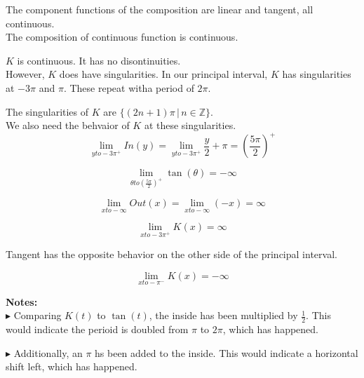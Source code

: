 \documentclass{ximera}
\begin{document}
The component functions of the composition are linear and tangent, all continuous. \\

The composition of continuous function is continuous.

$K$ is continuous. It has no disontinuities. \\


However, $K$ does have singularities. In our principal interval, $K$ has singularities at $-3\pi$ and $\pi$.  These repeat witha period of $2\pi$.


The singularities of $K$ are $\{ (2n+1)\pi  \, | \, n \in \mathbb{Z}  \}$. \\



We also need the behvaior of $K$ at these singularities. \\



\[
\lim\limits_{y to -3\pi^+} In(y) = \lim\limits_{y to -3\pi^+} \frac{y}{2} + \pi = \left( \frac {5\pi}{2} \right)^+
\]




\[
\lim\limits_{\theta to \left( \tfrac {5\pi}{2} \right)^+} \tan(\theta) = -\infty
\]




\[
\lim\limits_{x to -\infty} Out(x) = \lim\limits_{x to -\infty} (-x) = \infty
\]





\[
\lim\limits_{x to -3\pi^+} K(x) = \infty
\]


Tangent has the opposite behavior on the other side of the principal interval. 






\[
\lim\limits_{x to -\pi^-} K(x) = -\infty
\]




\textbf{Notes:} \\


$\blacktriangleright$ Comparing $K(t)$ to $\tan(t)$, the inside has been multiplied by $\frac{1}{2}$.  This would indicate the perioid is doubled from $\pi$ to $2\pi$, which has happened.  

$\blacktriangleright$ Additionally, an $\pi$ hs been added to the inside.  This would indicate a horizontal shift left, which has happened.
\end{document}
